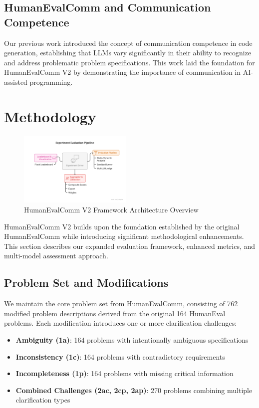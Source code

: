 \documentclass[conference]{IEEEtran}
\begin{document}
\subsection{HumanEvalComm and Communication Competence}

Our previous work \cite{wu2025humanevalcomm} introduced the concept of communication competence in code generation, establishing that LLMs vary significantly in their ability to recognize and address problematic problem specifications. This work laid the foundation for HumanEvalComm V2 by demonstrating the importance of communication in AI-assisted programming.

\section{Methodology}
\begin{figure}[ht]
    \centering
    \includegraphics[width=0.48\textwidth]{../architecture.png}
    \caption{HumanEvalComm V2 Framework Architecture Overview}
    \label{fig:architecture-overview}
\end{figure}

HumanEvalComm V2 builds upon the foundation established by the original HumanEvalComm while introducing significant methodological enhancements. This section describes our expanded evaluation framework, enhanced metrics, and multi-model assessment approach.

\subsection{Problem Set and Modifications}

We maintain the core problem set from HumanEvalComm, consisting of 762 modified problem descriptions derived from the original 164 HumanEval problems. Each modification introduces one or more clarification challenges:

\begin{itemize}
    \item \textbf{Ambiguity (1a)}: 164 problems with intentionally ambiguous specifications
    \item \textbf{Inconsistency (1c)}: 164 problems with contradictory requirements
    \item \textbf{Incompleteness (1p)}: 164 problems with missing critical information
    \item \textbf{Combined Challenges (2ac, 2cp, 2ap)}: 270 problems combining multiple clarification types
\end{itemize}
\end{document}
